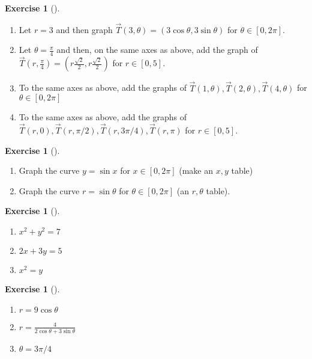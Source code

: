 \documentclass[10pt,]{book}
\theoremstyle{plain}
\theoremstyle{definition}
\theoremstyle{definition}
\theoremstyle{definition}
\theoremstyle{definition}
\newtheorem{exploration}[project]{Exercise}
\theoremstyle{definition}
\numberwithin{equation}{section}
\newcommand{\ds}{\displaystyle}
\begin{document}
\begin{exploration}[]\label{polar_coordinate_transformation_graph}
\leavevmode%
\begin{enumerate}[font=\bfseries,label=(\alph*),ref=\alph*]
\item\label{task-143} Let \(r=3\) and then graph \(\vec T(3,\theta)=(3\cos\theta,3\sin\theta)\) for \(\theta\in[0,2\pi]\).%
\item\label{task-144} Let \(\theta=\frac{\pi}{4}\) and then, on the same axes as above, add the graph of \(\vec T\left(r,\frac{\pi}{4}\right)=\left(r\frac{\sqrt 2}{2},r \frac{\sqrt 2}{2}\right)\) for \(r\in[0,5]\).%
\item\label{task-145} To the same axes as above, add the graphs of \(\vec T(1,\theta), \vec T(2,\theta), \vec T(4,\theta)\)  for \(\theta\in[0,2\pi]\)%
\item\label{task-146} To the same axes as above, add the graphs of \(\vec T(r,0), \vec T(r,\pi/2), \vec T(r,3\pi/4), \vec T(r,\pi)\) for \(r\in[0,5]\).%
\end{enumerate}
\end{exploration}
\begin{exploration}[]\label{exploration-88}
\leavevmode%
\begin{enumerate}[font=\bfseries,label=(\alph*),ref=\alph*]
\item\label{task-147} Graph the curve \(y=\sin x\) for \(x\in[0,2\pi]\) (make an \(x,y\) table)%
\item\label{task-148} Graph the curve \(r=\sin\theta\) for \(\theta\in[0,2\pi]\) (an \(r,\theta\) table).%
\end{enumerate}
\end{exploration}
\begin{exploration}[]\label{exploration-89}
\leavevmode%
\begin{enumerate}[font=\bfseries,label=(\alph*),ref=\alph*]
\item\label{task-149} \(x^2+y^2=7\)%
\item\label{task-150} \(2x+3y=5\)%
\item\label{task-151} \(x^2=y\)%
\end{enumerate}
\end{exploration}
\begin{exploration}[]\label{exploration-90}
\leavevmode%
\begin{enumerate}[font=\bfseries,label=(\alph*),ref=\alph*]
\item\label{task-152} \(r=9\cos\theta\)%
\item\label{task-153} \(\ds r=\frac{4}{2\cos\theta+3\sin\theta}\)%
\item\label{task-154} \(\theta = 3\pi/4\)%
\end{enumerate}
\end{exploration}
\typeout{************************************************}
\typeout{************************************************}
\end{document}
